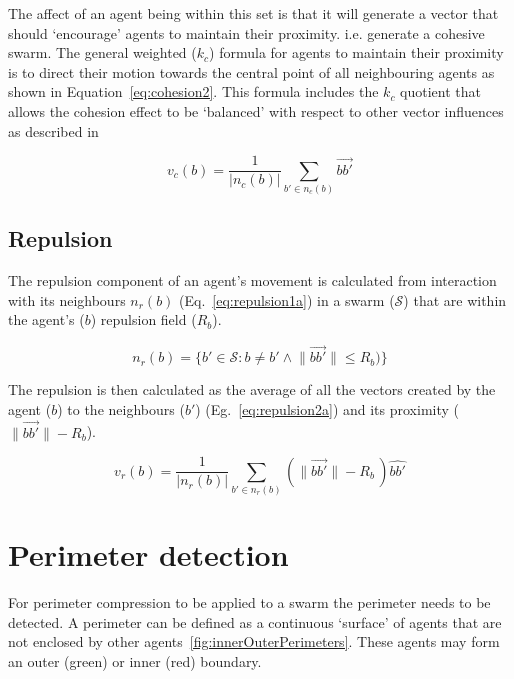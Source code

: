 \documentclass[12pt,a4paper]{IEEEtran}
\begin{document}
The affect of an agent being within this set is that it will generate a vector that should `encourage' agents to maintain their proximity. i.e. generate a cohesive swarm. The general weighted ($k_c$) formula for agents to maintain their proximity is to direct their motion towards the central point of all neighbouring agents as shown in Equation~\ref{eq:cohesion2}. This formula includes the $k_c$ quotient that allows the cohesion effect to be `balanced' with respect to other vector influences as described in ~\cite{eliot2017methods,eliot2018metric,eliot2019void} 

\begin{equation}\label{eq:cohesion2}
v_c(b) = \frac{1}{\lvert n_c(b)\rvert} \sum_{b' \in n_c(b)}\vec{b b'}
\end{equation}

\subsection{Repulsion}\label{repulsion:neighbours}
The repulsion component of an agent's movement is calculated from interaction with its neighbours $n_r(b)$ (Eq.~\ref{eq:repulsion1a}) in a swarm ($\mathcal{S}$) that are within the agent's ($b$) repulsion field ($R_b$).

\begin{equation}\label{eq:repulsion1a}
n_r(b) = \{b' \in \mathcal{S} : b \neq b' \land \lVert\vec{b b'}\rVert \leq R_b)\}
\end{equation}

The repulsion is then calculated as the average of all the vectors created by the agent ($b$) to the neighbours ($b'$) (Eg.~\ref{eq:repulsion2a}) and its proximity ($\lVert\vec{bb'}\rVert - R_b$).

\begin{equation}\label{eq:repulsion2a}
v_r(b) = \frac{1}{\lvert n_r(b)\rvert}\sum_{b' \in n_r(b)} \left(\lVert\vec{b b'}\rVert - R_b \, \right)\widehat{bb'}
\end{equation}

\section{Perimeter detection}\label{sec:perimeterDetection}
For perimeter compression to be applied to a swarm the perimeter needs to be detected. A perimeter can be defined as a continuous `surface' of agents that are not enclosed by other agents~\ref{fig:innerOuterPerimeters}. These agents may form an outer ({\color{green}green}) or inner ({\color{red}red}) boundary.
\end{document}
